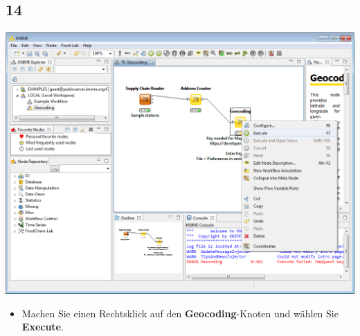\documentclass{beamer}
\begin{document}
\subsection{14}
\begin{frame}
	\begin{center}
  		\includegraphics[height=0.6\textheight]{14.png}
	\end{center}
	\begin{itemize}
		\item Machen Sie einen Rechtsklick auf den \textbf{Geocoding}-Knoten und wählen Sie \textbf{Execute}.
	\end{itemize}
\end{frame}
\end{document}
